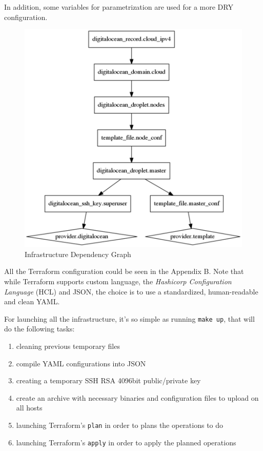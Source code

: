 In addition, some variables for parametrization are used for a more DRY configuration.

\begin{figure}[htbp]
\centering
\includegraphics{media/ch4-graph.png}
\caption{Infrastructure Dependency Graph}
\end{figure}

All the Terraform configuration could be seen in the Appendix B.  Note that while Terraform supports custom language, the \textit{Hashicorp Configuration Language} (HCL) and JSON, the choice is to use a standardized, human-readable and clean YAML.

For launching all the infrastructure, it's so simple as running \texttt{make up}, that will do the following tasks:
\begin{enumerate}
\item cleaning previous temporary files
\item compile YAML configurations into JSON
\item creating a temporary SSH RSA 4096bit public/private key
\item create an archive with necessary binaries and configuration files to upload on all hosts
\item launching Terraform's \texttt{plan} in order to plans the operations to do
\item launching Terraform's \texttt{apply} in order to apply the planned operations
\end{enumerate}

